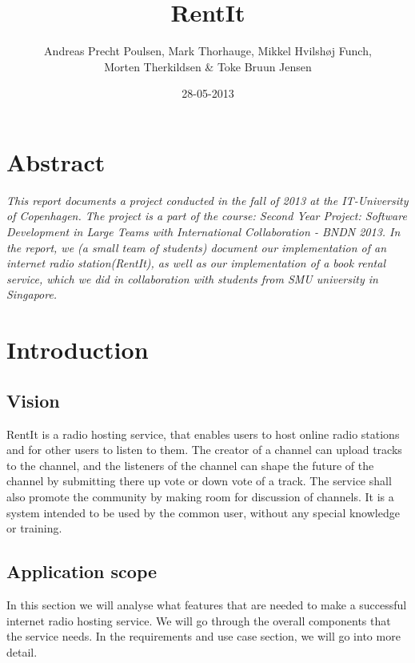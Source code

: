 \documentclass[a4paper,11pt,report]{article}
\begin{document}
\title{RentIt}
\author{Andreas Precht Poulsen, Mark Thorhauge, Mikkel Hvilsh\o j Funch,\\Morten Therkildsen \& Toke Bruun Jensen}
\date{28-05-2013}
\maketitle

\section*{Abstract}
\emph{
This report documents a project conducted in the fall of 2013 at the IT-University of Copenhagen. The project is a part of the course: Second Year Project: Software Development in Large Teams with International Collaboration - BNDN 2013. In the report, we (a small team of students) document our implementation of an internet radio station(RentIt), as well as our implementation of a book rental service, which we did in collaboration with students from SMU university in Singapore.}\\ 
\newpage

\tableofcontents

\section{Introduction}
\subsection{Vision}
RentIt is a radio hosting service, that enables users to host online radio stations and for other users to listen to them. The creator of a channel can upload tracks to the channel, and the listeners of the channel can shape the future of the channel by submitting there up vote or down vote of a track. The service shall also promote the community by making room for discussion of channels.
It is a system intended to be used by the common user, without any special knowledge or training.

\subsection{Application scope}
In this section we will analyse what features that are needed to make a successful internet radio hosting service. We will go through the overall components that the service needs. In the requirements and use case section, we will go into more detail.
\end{document}
